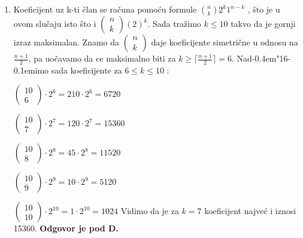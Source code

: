 \documentclass[a4paper,12pt]{report}
\def\dj{d\kern-0.4em\char"16\kern-0.1em}
\begin{document}
\begin{enumerate}[1.]
\item Koeficijent uz k-ti \v{c}lan se ra\v{c}una pomo\'{c}u formule $\binom{n}{k}2^k1^{n-k}$
, \v{s}to je u ovom slu\v{c}aju isto \v{s}to i $\left(\! \begin{array}{c} n \\k \end{array} \!\right) (2)^{k} $. Sada tra\v{z}imo $ k \leq 10$ takvo da je gornji izraz maksimalan. Znamo da $\left(\! \begin{array}{c} n \\k \end{array} \!\right) $ daje koeficijente simetri\v{c}ne u odnosu na $\frac{n + 1}{2} $, pa uo\v{c}avamo da ce maksimalno biti za $ k \geq \lceil \frac{n + 1}{2}\rceil   = 6$. Na\dj{}imo sada koeficijente za $ 6 \leq k \leq 10$ : 
\par $\left(\! \begin{array}{c} 10 \\6 \end{array} \!\right)  \cdot 2^{6} = 210 \cdot 2^{6} = 6720 $
\par $\left(\! \begin{array}{c} 10 \\7 \end{array} \!\right)  \cdot 2^{7} = 120 \cdot 2^{7} = 15360 $
\par $\left(\! \begin{array}{c} 10 \\8 \end{array} \!\right)  \cdot 2^{8} = 45 \cdot 2^{8} =  11520$
\par $\left(\! \begin{array}{c} 10 \\9 \end{array} \!\right)  \cdot 2^{9} = 10 \cdot 2^{9} = 5120 $
\par $\left(\! \begin{array}{c} 10 \\10 \end{array} \!\right)  \cdot 2^{10} = 1 \cdot 2^{10} = 1024 $
Vidimo da je za $k = 7$ koeficijent najve\'{c} i iznosi 15360. \textbf{Odgovor je pod D.}


\end{enumerate}
\end{document}
